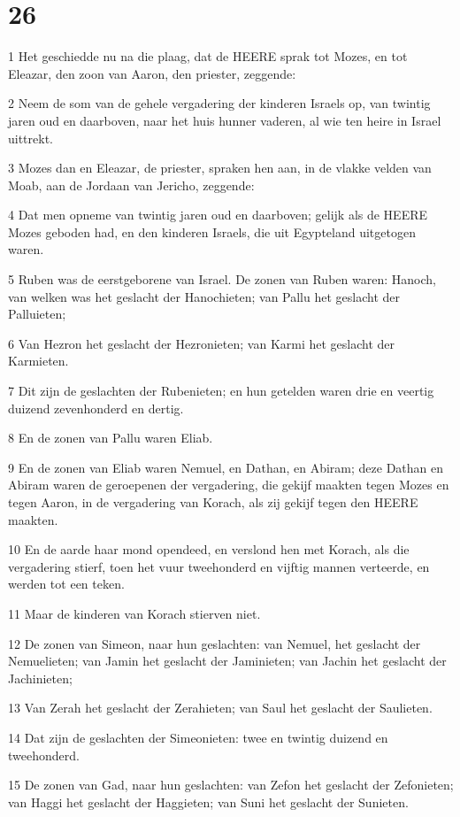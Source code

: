 \chapter{26}

\par 1 Het geschiedde nu na die plaag, dat de HEERE sprak tot Mozes, en tot Eleazar, den zoon van Aaron, den priester, zeggende:
\par 2 Neem de som van de gehele vergadering der kinderen Israels op, van twintig jaren oud en daarboven, naar het huis hunner vaderen, al wie ten heire in Israel uittrekt.
\par 3 Mozes dan en Eleazar, de priester, spraken hen aan, in de vlakke velden van Moab, aan de Jordaan van Jericho, zeggende:
\par 4 Dat men opneme van twintig jaren oud en daarboven; gelijk als de HEERE Mozes geboden had, en den kinderen Israels, die uit Egypteland uitgetogen waren.
\par 5 Ruben was de eerstgeborene van Israel. De zonen van Ruben waren: Hanoch, van welken was het geslacht der Hanochieten; van Pallu het geslacht der Palluieten;
\par 6 Van Hezron het geslacht der Hezronieten; van Karmi het geslacht der Karmieten.
\par 7 Dit zijn de geslachten der Rubenieten; en hun getelden waren drie en veertig duizend zevenhonderd en dertig.
\par 8 En de zonen van Pallu waren Eliab.
\par 9 En de zonen van Eliab waren Nemuel, en Dathan, en Abiram; deze Dathan en Abiram waren de geroepenen der vergadering, die gekijf maakten tegen Mozes en tegen Aaron, in de vergadering van Korach, als zij gekijf tegen den HEERE maakten.
\par 10 En de aarde haar mond opendeed, en verslond hen met Korach, als die vergadering stierf, toen het vuur tweehonderd en vijftig mannen verteerde, en werden tot een teken.
\par 11 Maar de kinderen van Korach stierven niet.
\par 12 De zonen van Simeon, naar hun geslachten: van Nemuel, het geslacht der Nemuelieten; van Jamin het geslacht der Jaminieten; van Jachin het geslacht der Jachinieten;
\par 13 Van Zerah het geslacht der Zerahieten; van Saul het geslacht der Saulieten.
\par 14 Dat zijn de geslachten der Simeonieten: twee en twintig duizend en tweehonderd.
\par 15 De zonen van Gad, naar hun geslachten: van Zefon het geslacht der Zefonieten; van Haggi het geslacht der Haggieten; van Suni het geslacht der Sunieten.
